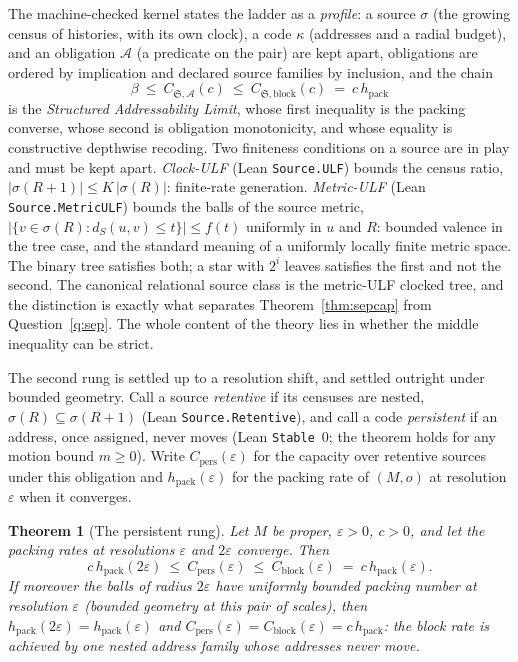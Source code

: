 \documentclass[11pt,reqno]{amsart}
\theoremstyle{plain}
\newtheorem{theorem}{Theorem}[section]
\theoremstyle{definition}
\newcommand{\hpack}{h_{\mathrm{pack}}}
\newcommand{\Cblock}{C_{\mathrm{block}}}
\newcommand{\eps}{\varepsilon}
\begin{document}
The machine-checked kernel states the ladder as a \emph{profile}: a source $\sigma$ (the growing census of histories, with its own clock), a code $\kappa$ (addresses and a radial budget), and an obligation $\mathcal A$ (a predicate on the pair) are kept apart, obligations are ordered by implication and declared source families by inclusion, and the chain
\[
\beta\ \le\ C_{\mathfrak S,\mathcal A}(c)\ \le\ C_{\mathfrak S,\mathrm{block}}(c)\ =\ c\,\hpack
\]
is the \emph{Structured Addressability Limit}, whose first inequality is the packing converse, whose second is obligation monotonicity, and whose equality is constructive depthwise recoding. Two finiteness conditions on a source are in play and must be kept apart. \emph{Clock-ULF} (Lean \texttt{Source.ULF}) bounds the census ratio, $|\sigma(R{+}1)|\le K\,|\sigma(R)|$: finite-rate generation. \emph{Metric-ULF} (Lean \texttt{Source.MetricULF}) bounds the balls of the source metric, $|\{v\in\sigma(R):d_S(u,v)\le t\}|\le f(t)$ uniformly in $u$ and $R$: bounded valence in the tree case, and the standard meaning of a uniformly locally finite metric space. The binary tree satisfies both; a star with $2^i$ leaves satisfies the first and not the second. The canonical relational source class is the metric-ULF clocked tree, and the distinction is exactly what separates Theorem~\ref{thm:sepcap} from Question~\ref{q:sep}. The whole content of the theory lies in whether the middle inequality can be strict.

The second rung is settled up to a resolution shift, and settled outright under bounded geometry. Call a source \emph{retentive} if its censuses are nested, $\sigma(R)\subseteq\sigma(R{+}1)$ (Lean \texttt{Source.Retentive}), and call a code \emph{persistent} if an address, once assigned, never moves (Lean \texttt{Stable}~$0$; the theorem holds for any motion bound $m\ge0$). Write $C_{\mathrm{pers}}(\eps)$ for the capacity over retentive sources under this obligation and $\hpack(\eps)$ for the packing rate of $(M,o)$ at resolution $\eps$ when it converges.

\begin{theorem}[The persistent rung]\label{thm:persistent}
Let $M$ be proper, $\eps>0$, $c>0$, and let the packing rates at resolutions $\eps$ and $2\eps$ converge. Then
\[
c\,\hpack(2\eps)\ \le\ C_{\mathrm{pers}}(\eps)\ \le\ \Cblock(\eps)\ =\ c\,\hpack(\eps).
\]
If moreover the balls of radius $2\eps$ have uniformly bounded packing number at resolution $\eps$ (bounded geometry at this pair of scales), then $\hpack(2\eps)=\hpack(\eps)$ and $C_{\mathrm{pers}}(\eps)=\Cblock(\eps)=c\,\hpack$: the block rate is achieved by one nested address family whose addresses never move.
\end{theorem}
\end{document}
